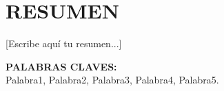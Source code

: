 
\chapter*{RESUMEN}
\thispagestyle{fancy}

%

[Escribe aquí tu resumen...]

\vspace{1cm}

\noindent\textbf{PALABRAS CLAVES:}\\
Palabra1, Palabra2, Palabra3, Palabra4, Palabra5.

\newpage
